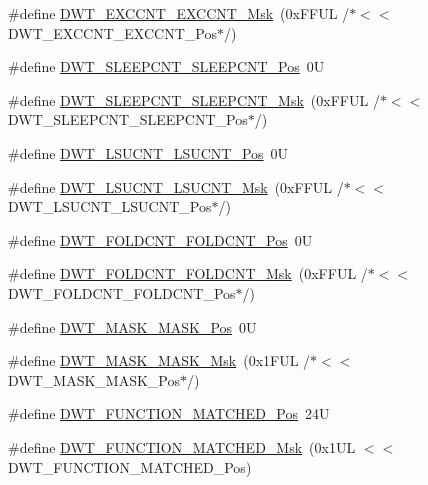 \begin{DoxyCompactItemize}
\item 
\#define \hyperlink{group___c_m_s_i_s___d_w_t_ga057fa604a107b58a198bbbadb47e69c9}{D\+W\+T\+\_\+\+E\+X\+C\+C\+N\+T\+\_\+\+E\+X\+C\+C\+N\+T\+\_\+\+Msk}~(0x\+F\+F\+U\+L /$\ast$$<$$<$ D\+W\+T\+\_\+\+E\+X\+C\+C\+N\+T\+\_\+\+E\+X\+C\+C\+N\+T\+\_\+\+Pos$\ast$/)
\item 
\#define \hyperlink{group___c_m_s_i_s___d_w_t_ga0371a84a7996dc5852c56afb2676ba1c}{D\+W\+T\+\_\+\+S\+L\+E\+E\+P\+C\+N\+T\+\_\+\+S\+L\+E\+E\+P\+C\+N\+T\+\_\+\+Pos}~0U
\item 
\#define \hyperlink{group___c_m_s_i_s___d_w_t_ga1e340751d71413fef400a0a1d76cc828}{D\+W\+T\+\_\+\+S\+L\+E\+E\+P\+C\+N\+T\+\_\+\+S\+L\+E\+E\+P\+C\+N\+T\+\_\+\+Msk}~(0x\+F\+F\+U\+L /$\ast$$<$$<$ D\+W\+T\+\_\+\+S\+L\+E\+E\+P\+C\+N\+T\+\_\+\+S\+L\+E\+E\+P\+C\+N\+T\+\_\+\+Pos$\ast$/)
\item 
\#define \hyperlink{group___c_m_s_i_s___d_w_t_gab9394c7911b0b4312a096dad91d53a3d}{D\+W\+T\+\_\+\+L\+S\+U\+C\+N\+T\+\_\+\+L\+S\+U\+C\+N\+T\+\_\+\+Pos}~0U
\item 
\#define \hyperlink{group___c_m_s_i_s___d_w_t_ga2186d7fc9317e20bad61336ee2925615}{D\+W\+T\+\_\+\+L\+S\+U\+C\+N\+T\+\_\+\+L\+S\+U\+C\+N\+T\+\_\+\+Msk}~(0x\+F\+F\+U\+L /$\ast$$<$$<$ D\+W\+T\+\_\+\+L\+S\+U\+C\+N\+T\+\_\+\+L\+S\+U\+C\+N\+T\+\_\+\+Pos$\ast$/)
\item 
\#define \hyperlink{group___c_m_s_i_s___d_w_t_ga7f8af5ac12d178ba31a516f6ed141455}{D\+W\+T\+\_\+\+F\+O\+L\+D\+C\+N\+T\+\_\+\+F\+O\+L\+D\+C\+N\+T\+\_\+\+Pos}~0U
\item 
\#define \hyperlink{group___c_m_s_i_s___d_w_t_ga9cb73d0342d38b14e41027d3c5c02647}{D\+W\+T\+\_\+\+F\+O\+L\+D\+C\+N\+T\+\_\+\+F\+O\+L\+D\+C\+N\+T\+\_\+\+Msk}~(0x\+F\+F\+U\+L /$\ast$$<$$<$ D\+W\+T\+\_\+\+F\+O\+L\+D\+C\+N\+T\+\_\+\+F\+O\+L\+D\+C\+N\+T\+\_\+\+Pos$\ast$/)
\item 
\#define \hyperlink{group___c_m_s_i_s___d_w_t_gaf798ae34e2b9280ea64f4d9920cd2e7d}{D\+W\+T\+\_\+\+M\+A\+S\+K\+\_\+\+M\+A\+S\+K\+\_\+\+Pos}~0U
\item 
\#define \hyperlink{group___c_m_s_i_s___d_w_t_gadd798deb0f1312feab4fb05dcddc229b}{D\+W\+T\+\_\+\+M\+A\+S\+K\+\_\+\+M\+A\+S\+K\+\_\+\+Msk}~(0x1\+F\+U\+L /$\ast$$<$$<$ D\+W\+T\+\_\+\+M\+A\+S\+K\+\_\+\+M\+A\+S\+K\+\_\+\+Pos$\ast$/)
\item 
\#define \hyperlink{group___c_m_s_i_s___d_w_t_ga22c5787493f74a6bacf6ffb103a190ba}{D\+W\+T\+\_\+\+F\+U\+N\+C\+T\+I\+O\+N\+\_\+\+M\+A\+T\+C\+H\+E\+D\+\_\+\+Pos}~24U
\item 
\#define \hyperlink{group___c_m_s_i_s___d_w_t_gac8b1a655947490280709037808eec8ac}{D\+W\+T\+\_\+\+F\+U\+N\+C\+T\+I\+O\+N\+\_\+\+M\+A\+T\+C\+H\+E\+D\+\_\+\+Msk}~(0x1\+U\+L $<$$<$ D\+W\+T\+\_\+\+F\+U\+N\+C\+T\+I\+O\+N\+\_\+\+M\+A\+T\+C\+H\+E\+D\+\_\+\+Pos)
$$
\end{DoxyCompactItemize}
